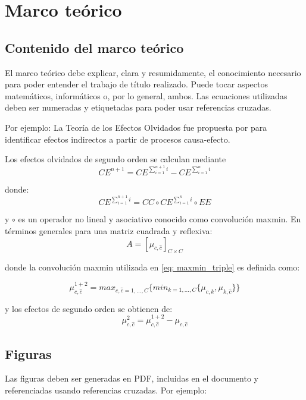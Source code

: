 \chapter{Marco teórico}
\section{Contenido del marco teórico}
El marco teórico debe explicar, clara y resumidamente, el conocimiento necesario para poder entender el trabajo de título realizado. Puede tocar aspectos matemáticos, informáticos o, por lo general, ambos. Las ecuaciones utilizadas deben ser numeradas y etiquetadas para poder usar referencias cruzadas.

Por ejemplo: 
La Teoría de los Efectos Olvidados fue propuesta por \textcite{kaufmann1988modelos} para identificar efectos indirectos a partir de procesos causa-efecto.

Los efectos olvidados de segundo orden se calculan mediante
\begin{equation}
    CE^{n+1}= CE^{\sum_{i=1}^{n+1}{i}} - CE^{\sum_{i=1}^n{i}}
\end{equation}

donde:
\begin{equation}
    CE^{\sum_{i=1}^{n+1}{i}} = CC \circ CE^{\sum_{i=1}^n{i}} \circ EE
    \label{eq: maxmin_triple}
\end{equation}

y $\circ$ es un operador no lineal y asociativo conocido como convolución maxmin. En términos generales para una matriz cuadrada y reflexiva:
\begin{equation}
    A = [ \mu_{c, \hat{c}}]_{ C \times C} 
\end{equation}

donde la convolución maxmin utilizada en \ref{eq: maxmin_triple} es definida como:

\begin{equation}
    \mu_{c,\hat{c}}^{1+2} = max_{c, \hat{c} = 1,..., C}\{ min_{k = 1,...,C}\{\mu_{c,k}, \mu_{k,\hat{c}} \} \}
    \label{eq: maxmin}
\end{equation}

y los efectos de segundo orden se obtienen de:
\begin{equation}
    \mu_{c,\hat{c}}^{2} = \mu_{c,\hat{c}}^{1+2} - \mu_{c, \hat{c}}
\end{equation}

\section{Figuras\label{Sec: Figuras}}
Las figuras deben ser generadas en PDF, incluidas en el documento y referenciadas usando referencias cruzadas. Por ejemplo:

